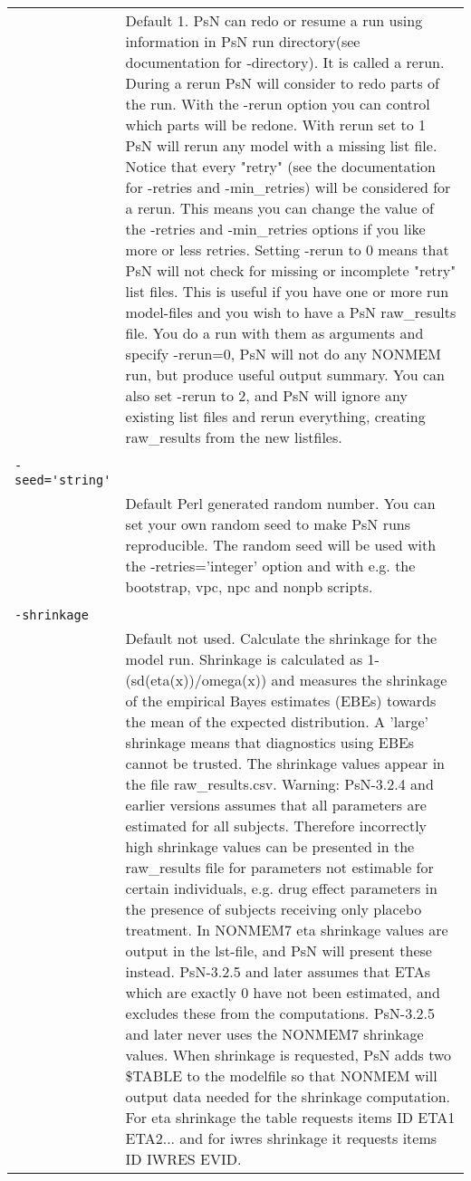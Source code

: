 \documentclass[a4paper,12pt]{article}
\begin{document}
\begin{longtable}{p{1in}p{4in}}
\nopagebreak
 & Default 1. PsN can redo or resume a run using information in PsN run directory(see documentation for -directory). It is called a rerun. During a rerun PsN will consider to redo parts of the run. With the -rerun option you can control which parts will be redone. With rerun set to 1 PsN will rerun any model with a missing list file. Notice that every "retry" (see the documentation for -retries and -min\_retries) will be considered for a rerun. This means you can change the value of the -retries and -min\_retries options if you like more or less retries. Setting -rerun to 0 means that PsN will not check for  missing or incomplete "retry" list files. This is useful if you have one or more run model-files and you wish to have a PsN raw\_results file. You do a run with them as arguments and specify -rerun=0, PsN will not do any NONMEM run, but produce useful output summary. You can also set -rerun to 2, and PsN will ignore any existing list files and rerun everything, creating raw\_results from the new listfiles. \\
\\
\verb|-seed='string'| & \\
\nopagebreak
 & Default Perl generated random number. You can set your own random seed to make PsN runs reproducible. The random seed will be used with the -retries='integer' option and with e.g. the bootstrap, vpc, npc and nonpb scripts. \\
\\
\verb|-shrinkage| & \\
\nopagebreak
 & Default not used. Calculate the shrinkage for the model run.  Shrinkage is calculated as 1-(sd(eta(x))/omega(x)) and measures the shrinkage of the empirical Bayes estimates (EBEs) towards the mean of the expected distribution.  A 'large' shrinkage means that diagnostics using EBEs cannot be trusted. The shrinkage values appear in the file raw\_results.csv. Warning: PsN-3.2.4 and earlier versions assumes that all parameters are estimated for all subjects. Therefore incorrectly high shrinkage values can be presented in the raw\_results file for parameters not estimable for certain individuals, e.g. drug effect parameters in the presence of subjects receiving only placebo treatment. In NONMEM7 eta shrinkage values are output in the lst-file, and PsN will present these instead. PsN-3.2.5 and later assumes that ETAs which are exactly 0 have not been estimated, and excludes these from the computations. PsN-3.2.5 and later never uses the NONMEM7 shrinkage values. When shrinkage is requested, PsN adds two \$TABLE to the modelfile so that NONMEM will output data needed for the shrinkage computation. For eta shrinkage the table requests items ID ETA1 ETA2... and for iwres shrinkage it requests items ID IWRES EVID. \\

\end{longtable}
\end{document}
